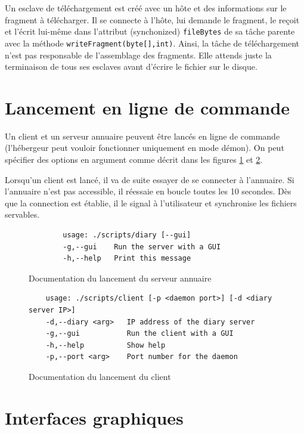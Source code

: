 \documentclass[french]{template}
\begin{document}
Un esclave de téléchargement est créé avec un hôte et des informations sur le fragment à télécharger. Il se connecte à l'hôte, lui demande le fragment, le reçoit et  l'écrit lui-même dans l'attribut (synchonized) \texttt{fileBytes} de sa tâche parente avec la méthode \texttt{writeFragment(byte[],int)}. Ainsi, la tâche de téléchargement n'est pas responsable de l'assemblage des fragments. Elle attends juste la terminaison de tous ses esclaves avant d'écrire le fichier sur le disque.

\section{Lancement en ligne de commande}

Un client et un serveur annuaire peuvent être lancés en ligne de commande (l'hébergeur peut vouloir fonctionner uniquement en mode démon). On peut spécifier des options en argument comme décrit dans les figures \ref{fig:diary-cli-doc} et \ref{fig:client-cli-doc}.

Lorsqu'un client est lancé, il va de suite essayer de se connecter à l'annuaire. Si l'annuaire n'est pas accessible, il réessaie en boucle toutes les 10 secondes. Dès que la connection est établie, il le signal à l'utilisateur et synchronise les fichiers servables.

\begin{figure}[h]
    \begin{lstlisting}
        usage: ./scripts/diary [--gui]
        -g,--gui    Run the server with a GUI
        -h,--help   Print this message
    \end{lstlisting}
    \caption{Documentation du lancement du serveur annuaire}
    \label{fig:diary-cli-doc}
\end{figure}

\begin{figure}[h]
    \begin{lstlisting}
    usage: ./scripts/client [-p <daemon port>] [-d <diary server IP>]
    -d,--diary <arg>   IP address of the diary server
    -g,--gui           Run the client with a GUI
    -h,--help          Show help
    -p,--port <arg>    Port number for the daemon
\end{lstlisting}
    \caption{Documentation du lancement du client}
    \label{fig:client-cli-doc}
\end{figure}

\section{Interfaces graphiques}
\end{document}
